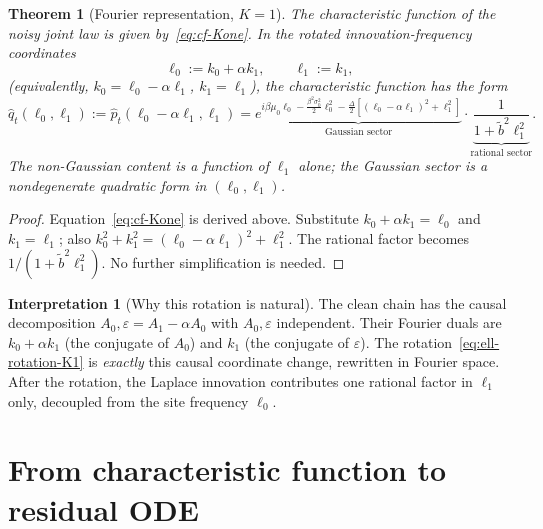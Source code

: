 \documentclass[11pt,a4paper,openany]{book}
\theoremstyle{plainserif}
\newtheorem{theorem}{Theorem}[chapter]
\theoremstyle{definition}
\theoremstyle{remarkstyle}
\newtheorem*{interpretation}{Interpretation}
\newcommand{\btilde}{\tilde{b}}
\newcommand{\hatfn}[1]{\widehat{#1}}
\begin{document}
\begin{theorem}[Fourier representation, $K{=}1$]
\label{thm:fourier-K1}
The characteristic function of the noisy joint law is given
by~\eqref{eq:cf-Kone}. In the rotated innovation-frequency coordinates
\begin{equation}
\ell_0 := k_0 + \alpha k_1, \qquad
\ell_1 := k_1,
\label{eq:ell-rotation-K1}
\end{equation}
(equivalently, $k_0 = \ell_0 - \alpha \ell_1$, $k_1 = \ell_1$),
the characteristic function has the form
\begin{equation}
\hatfn{q}_t(\ell_0, \ell_1) :=
\hatfn{p}_t(\ell_0 - \alpha\ell_1, \ell_1)
= \underbrace{e^{i\beta\mu_0 \ell_0
                - \frac{\beta^2\sigma_0^2}{2}\ell_0^2
                - \frac{\Delta}{2}[(\ell_0 - \alpha\ell_1)^2 + \ell_1^2]}}_{\text{Gaussian sector}}
  \cdot \underbrace{\frac{1}{1 + \btilde^2 \ell_1^2}}_{\text{rational sector}}.
\label{eq:cf-rotated-K1}
\end{equation}
The non-Gaussian content is a function of $\ell_1$ alone; the
Gaussian sector is a nondegenerate quadratic form in $(\ell_0,\ell_1)$.
\end{theorem}

\begin{proof}
Equation~\eqref{eq:cf-Kone} is derived above.
Substitute $k_0 + \alpha k_1 = \ell_0$ and $k_1 = \ell_1$;
also $k_0^2 + k_1^2 = (\ell_0 - \alpha\ell_1)^2 + \ell_1^2$. The rational
factor becomes $1/(1 + \btilde^2 \ell_1^2)$. No further simplification is
needed.
\end{proof}

\begin{interpretation}[Why this rotation is natural]
The clean chain has the causal decomposition
$A_0, \varepsilon = A_1 - \alpha A_0$ with $A_0, \varepsilon$ independent.
Their Fourier duals are $k_0 + \alpha k_1$ (the conjugate of $A_0$) and
$k_1$ (the conjugate of $\varepsilon$). The rotation~\eqref{eq:ell-rotation-K1}
is \emph{exactly} this causal coordinate change, rewritten in Fourier space.
After the rotation, the Laplace innovation contributes one rational factor
in $\ell_1$ only, decoupled from the site frequency $\ell_0$.
\end{interpretation}

\section{From characteristic function to residual ODE}
\label{sec:residual-ODE}
\end{document}
